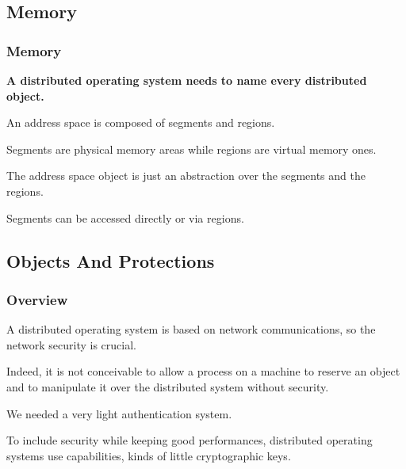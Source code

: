 %
%

\subsection{Memory}


\begin{frame}
  \frametitle{Memory}

  \textbf{A distributed operating system needs to name every
    distributed object.}

  \-

  An address space is composed of segments and regions.

  \-

  Segments are physical memory areas while regions are virtual memory
  ones.

  \-

  The address space object is just an abstraction over the segments and
  the regions.

  \-

  Segments can be accessed directly or via regions.
\end{frame}

%
%

\subsection{Objects And Protections}


\begin{frame}
  \frametitle{Overview}

  A distributed operating system is based on network communications, so
  the network security is crucial.

  \-

  Indeed, it is not conceivable to allow a process on a machine
  to reserve an object and to manipulate it over the distributed
  system without security.

  \-

  We needed a very light authentication system.

  \-

  To include security while keeping good performances, distributed
  operating systems use capabilities, kinds of little cryptographic keys.
\end{frame}


